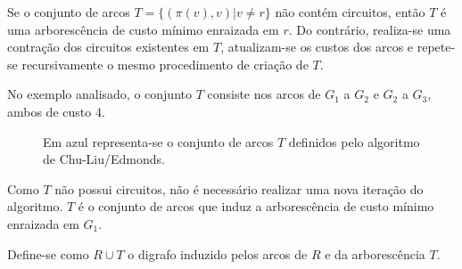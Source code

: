 \begin{enumerate}
            Se o conjunto de arcos $T = \{(\pi(v), v) | v \neq r\}$ não contém circuitos, então $T$ é uma arborescência de custo mínimo enraizada em $r$.
            Do contrário, realiza-se uma contração dos circuitos existentes em $T$, atualizam-se os custos dos arcos e repete-se recursivamente o mesmo procedimento de criação de $T$.

            No exemplo analisado, o conjunto $T$ consiste nos arcos de $G_1$ a $G_2$ e $G_2$ a $G_3$, ambos de custo 4.

            \begin{figure}[H]
                \centering
            \caption{Em azul representa-se o conjunto de arcos $T$ definidos pelo algoritmo de Chu-Liu/Edmonds.}
            \label{chu-liu-p}
            \end{figure}


            Como $T$ não possui circuitos, não é necessário realizar uma nova iteração do algoritmo.
            $T$ é o conjunto de arcos que induz a arborescência de custo mínimo enraizada em $G_1$.

            Define-se como $R \cup T$ o digrafo induzido pelos arcos de $R$ e da arborescência $T$.


        \begin{figure}[H]
            \centering
            \begin{tikzpicture}[node distance=3cm, every loop/.style={},thick,main node/.style={circle,draw,font=\sffamily\Large}]


\end{tikzpicture}
\end{figure}
\end{enumerate}
